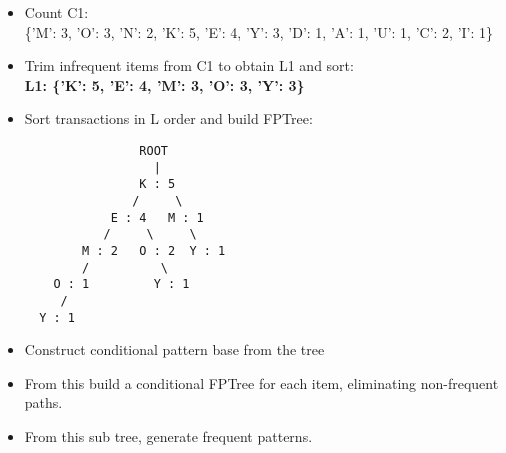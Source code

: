 \documentclass[11pt]{article}
\begin{document}
\begin{itemize}
\item
  Count C1:\\
  \{'M': 3, 'O': 3, 'N': 2, 'K': 5, 'E': 4, 'Y': 3, 'D': 1, 'A': 1, 'U':
  1, 'C': 2, 'I': 1\}
\item
  Trim infrequent items from C1 to obtain L1 and sort:\\
  \textbf{L1: \{'K': 5, 'E': 4, 'M': 3, 'O': 3, 'Y': 3\}}
\item
  Sort transactions in L order and build FPTree:

\begin{verbatim}
                ROOT
                  |
                K : 5
               /     \
            E : 4   M : 1
           /     \     \
        M : 2   O : 2  Y : 1 
        /          \
    O : 1         Y : 1
     /
  Y : 1 
\end{verbatim}
\item
  Construct conditional pattern base from the tree
\item
  From this build a conditional FPTree for each item, eliminating
  non-frequent paths.
\item
  From this sub tree, generate frequent patterns.
\end{itemize}
\end{document}
